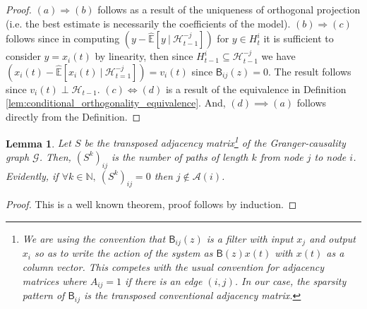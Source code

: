 \documentclass{statsoc}
\def\gcg{\mathcal{G}}  %
\def\B{\mathsf{B}}  %
\def\H{\mathcal{H}}  %
\newcommand{\linE}[2]{\hat{\E}[#1\ |\ #2]}  %
\newcommand{\anc}[1]{\mathcal{A}(#1)}  %
\newtheorem{lemma}{Lemma}
\def\H{\mathcal{H}}  %
\def\E{\mathbb{E}}  %
\def\N{\mathbb{N}}  %
\begin{document}
\begin{proof}

  $(a) \Rightarrow (b)$ follows as a result of the uniqueness of orthogonal
  projection (i.e. the best estimate is necessarily the coefficients
  of the model).  $(b) \Rightarrow (c)$ follows since in computing
  $(y - \linE{y}{\H_{t - 1}^{-j}})$ for $y \in H_t^i$ it is sufficient
  to consider $y = x_i(t)$ by linearity, then since
  $H_{t - 1}^i \subseteq \H_{t - 1}^{-j}$ we have
  $(x_i(t) - \linE{x_i(t)}{\H_{t = 1}^{-j}}) = v_i(t)$ since
  $\B_{ij}(z) = 0$.  The result follows since
  $v_i(t) \perp \H_{t - 1}$.  $(c) \iff (d)$ is a result of the equivalence
  in Definition \ref{lem:conditional_orthogonality_equivalence}.  And,
  $(d) \implies (a)$ follows directly from the Definition.
\end{proof}

\begin{lemma}
  \label{lem:adj_matrix}
  Let $S$ be the transposed adjacency matrix\footnote{\footnotesize We
    are using the convention that $\B_{ij}(z)$ is a filter with input
    $x_j$ and output $x_i$ so as to write the action of the system as
    $\B(z)x(t)$ with $x(t)$ as a column vector.  This competes with
    the usual convention for adjacency matrices where $A_{ij} = 1$ if
    there is an edge $(i, j)$.  In our case, the sparsity pattern of
    $\B_{ij}$ is the \textit{transposed} conventional adjacency
    matrix.} of the Granger-causality graph $\gcg$.  Then,
  $(S^k)_{ij}$ is the number of paths of length $k$ from node $j$ to
  node $i$.  Evidently, if $\forall k \in \N,\ (S^k)_{ij} = 0$ then
  $j \not\in \anc{i}$.
\end{lemma}
\begin{proof}
  This is a well known theorem, proof follows by induction.
\end{proof}
\end{document}
